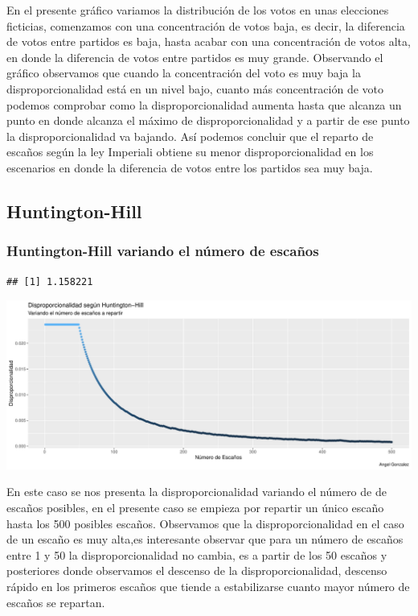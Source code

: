 \documentclass[12pt,a4paper,]{book}
\numberwithin{dummy}{section}
\theoremstyle{ocrenumbox}
\theoremstyle{blacknumex}
\theoremstyle{blacknumbox}
\theoremstyle{ocrenum}
\theoremstyle{ocrenum}
\begin{document}
En el presente gráfico variamos la distribución de los votos en unas
elecciones ficticias, comenzamos con una concentración de votos baja, es
decir, la diferencia de votos entre partidos es baja, hasta acabar con
una concentración de votos alta, en donde la diferencia de votos entre
partidos es muy grande. Observando el gráfico observamos que cuando la
concentración del voto es muy baja la disproporcionalidad está en un
nivel bajo, cuanto más concentración de voto podemos comprobar como la
disproporcionalidad aumenta hasta que alcanza un punto en donde alcanza
el máximo de disproporcionalidad y a partir de ese punto la
disproporcionalidad va bajando. Así podemos concluir que el reparto de
escaños según la ley Imperiali obtiene su menor disproporcionalidad en
los escenarios en donde la diferencia de votos entre los partidos sea
muy baja.

\hypertarget{huntington-hill}{%
\subsection{Huntington-Hill}\label{huntington-hill}}

\hypertarget{huntington-hill-variando-el-nuxfamero-de-escauxf1os}{%
\subsubsection{Huntington-Hill variando el número de
escaños}\label{huntington-hill-variando-el-nuxfamero-de-escauxf1os}}

\begin{verbatim}
## [1] 1.158221
\end{verbatim}

\begin{center}\includegraphics[width=0.95\linewidth]{figurasR/unnamed-chunk-29-1} \end{center}

En este caso se nos presenta la disproporcionalidad variando el número
de de escaños posibles, en el presente caso se empieza por repartir un
único escaño hasta los 500 posibles escaños. Observamos que la
disproporcionalidad en el caso de un escaño es muy alta,es interesante
observar que para un número de escaños entre 1 y 50 la
disproporcionalidad no cambia, es a partir de los 50 escaños y
posteriores donde observamos el descenso de la disproporcionalidad,
descenso rápido en los primeros escaños que tiende a estabilizarse
cuanto mayor número de escaños se repartan.
\end{document}
